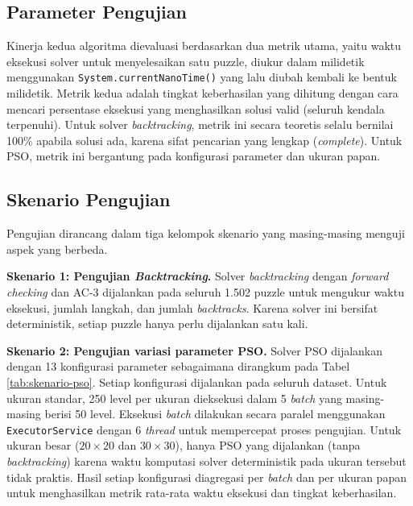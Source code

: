 \subsection{Parameter Pengujian}
\label{subsec:parameter-pengujian}

Kinerja kedua algoritma dievaluasi berdasarkan dua metrik utama, yaitu waktu eksekusi solver untuk menyelesaikan satu puzzle, diukur dalam milidetik menggunakan \texttt{System.currentNanoTime()} yang lalu diubah kembali ke bentuk milidetik. Metrik kedua adalah tingkat keberhasilan yang dihitung dengan cara mencari persentase eksekusi yang menghasilkan solusi valid (seluruh kendala terpenuhi). Untuk solver \textit{backtracking}, metrik ini secara teoretis selalu bernilai 100\% apabila solusi ada, karena sifat pencarian yang lengkap (\textit{complete}). Untuk PSO, metrik ini bergantung pada konfigurasi parameter dan ukuran papan.

\subsection{Skenario Pengujian}
\label{subsec:skenario-pengujian-sub}

Pengujian dirancang dalam tiga kelompok skenario yang masing-masing menguji aspek yang berbeda.

\textbf{Skenario 1: Pengujian \textit{Backtracking}.} Solver \textit{backtracking} dengan \textit{forward checking} dan AC-3 dijalankan pada seluruh 1.502 puzzle untuk mengukur waktu eksekusi, jumlah langkah, dan jumlah \textit{backtracks}. Karena solver ini bersifat deterministik, setiap puzzle hanya perlu dijalankan satu kali.

\textbf{Skenario 2: Pengujian variasi parameter PSO.} Solver PSO dijalankan dengan 13 konfigurasi parameter sebagaimana dirangkum pada Tabel \ref{tab:skenario-pso}. Setiap konfigurasi dijalankan pada seluruh dataset. Untuk ukuran standar, 250 level per ukuran dieksekusi dalam 5 \textit{batch} yang masing-masing berisi 50 level. Eksekusi \textit{batch} dilakukan secara paralel menggunakan \texttt{ExecutorService} dengan 6 \textit{thread} untuk mempercepat proses pengujian. Untuk ukuran besar ($20 \times 20$ dan $30 \times 30$), hanya PSO yang dijalankan (tanpa \textit{backtracking}) karena waktu komputasi solver deterministik pada ukuran tersebut tidak praktis. Hasil setiap konfigurasi diagregasi per \textit{batch} dan per ukuran papan untuk menghasilkan metrik rata-rata waktu eksekusi dan tingkat keberhasilan.

